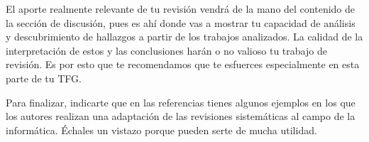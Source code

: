 El aporte realmente relevante de tu revisión vendrá de la mano del contenido de la sección de discusión, pues es ahí donde vas a mostrar tu capacidad de análisis y descubrimiento de hallazgos a partir de los trabajos analizados. La calidad de la interpretación de estos y las conclusiones harán o no valioso tu trabajo de revisión. Es por esto que te recomendamos que te esfuerces especialmente en esta parte de tu TFG. 

Para finalizar, indicarte que en las referencias \cite{carrera2022angela,kofod2022anders,silva2016rodrigo} tienes algunos ejemplos en los que los autores realizan una adaptación de las revisiones sistemáticas al campo de la informática. Échales un vistazo porque pueden serte de mucha utilidad.

